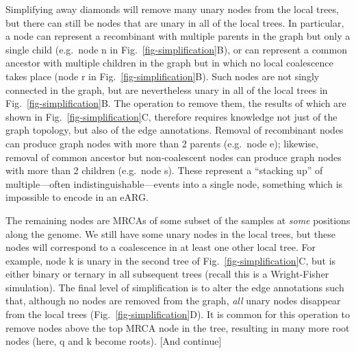 \documentclass{article}
\begin{document}
Simplifying away diamonds will remove many unary nodes from the
local trees, but there can still be nodes that are unary in all
of the local trees. In particular, a node can represent a recombinant
with multiple parents in the graph but only a single child (e.g.\ node \textsf{n}
in Fig.~\ref{fig-simplification}B), or can represent a common ancestor with
multiple children in the graph but in which no local coalescence takes place
(node \textsf{r} in Fig.~\ref{fig-simplification}B).
Such nodes are not singly connected in the graph, but are nevertheless unary in
all of the local trees in Fig.~\ref{fig-simplification}B. The operation to remove them,
the results of which are shown in Fig.~\ref{fig-simplification}C,
therefore requires knowledge not just of the graph topology, but also of the
edge annotations. Removal of recombinant nodes can produce graph nodes with
more than 2 parents (e.g.~node \textsf{e}); likewise, removal of
common ancestor but non-coalescent nodes can produce graph nodes with
more than 2 children (e.g.~node \textsf{s}). These represent a ``stacking up'' of
multiple---often indistinguishable---events into a single node,
something which is impossible to encode in an eARG.

The remaining nodes are MRCAs of some subset of the samples
at \emph{some} positions along the genome. We still have
some unary nodes in the local trees, but these nodes will
correspond to a coalescence in at least one other
local tree. For example, node  \textsf{k} is unary in the second tree
of Fig.~\ref{fig-simplification}C, but is either binary
or ternary in all subsequent trees (recall this is a Wright-Fisher
simulation). The final level of simplification is to alter the edge annotations
such that, although no nodes are removed from the graph, \emph{all}
unary nodes disappear from the local trees (Fig.~\ref{fig-simplification}D).
It is common for this operation to remove nodes above the top MRCA node
in the tree, resulting in many more root nodes (here, \textsf{q} and \textsf{k}
become roots). [And continue]
\end{document}
